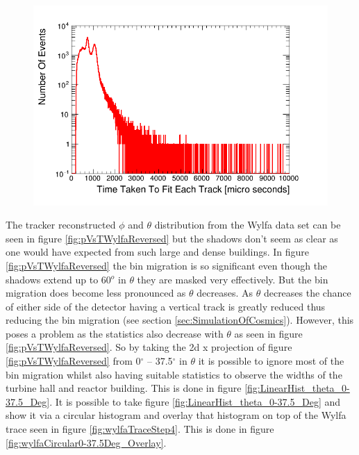  \begin{figure}[htbp]
 \centering
 \includegraphics[width=0.7\linewidth]{Chapter5/Figs/Raster/wylfaTrackerTimeLog.png}
 \label{fig:wylfaTrackerTimeLog}
\end{figure}

The tracker reconstructed $\phi$ and $\theta$ distribution from the Wylfa data set can be seen in figure \ref{fig:pVsTWylfaReversed} but the shadows don't seem as clear as one would have expected from such large and dense buildings. In figure \ref{fig:pVsTWylfaReversed} the bin migration is so significant even though the shadows extend up to 60$^o$ in $\theta$ they are masked very effectively. But the bin migration does become less pronounced as $\theta$ decreases. As $\theta$ decreases the chance of either side of the detector having a vertical track is greatly reduced thus reducing the bin migration (see section \ref{sec:SimulationOfCosmics}). However, this poses a problem as the statistics also decrease with $\theta$ as seen in figure \ref{fig:pVsTWylfaReversed}. So by taking the 2d x projection of figure \ref{fig:pVsTWylfaReversed} from 0$^\circ$ -- 37.5$^\circ$ in $\theta$ it is possible to ignore most of the bin migration whilst also having suitable statistics to observe the widths of the turbine hall and reactor building. This is done in figure \ref{fig:LinearHist_theta_0-37.5_Deg}. It is possible to take figure \ref{fig:LinearHist_theta_0-37.5_Deg} and show it via a circular histogram and overlay that histogram on top of the Wylfa trace seen in figure \ref{fig:wylfaTraceStep4}. This is done in figure \ref{fig:wylfaCircular0-37.5Deg_Overlay}. 


